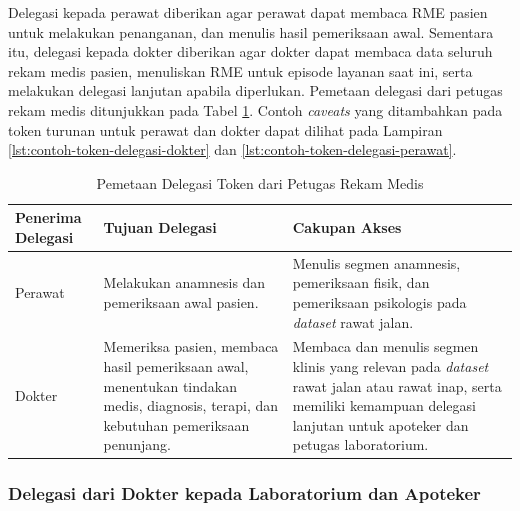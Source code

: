 \documentclass[bahasa, 12pt, a4paper, onecolumn, oneside, final]{report}
\begin{document}
Delegasi kepada perawat diberikan agar perawat dapat membaca RME pasien untuk melakukan penanganan, dan menulis hasil pemeriksaan awal. Sementara itu, delegasi kepada dokter diberikan agar dokter dapat membaca data seluruh rekam medis pasien, menuliskan RME untuk episode layanan saat ini, serta melakukan delegasi lanjutan apabila diperlukan. Pemetaan delegasi dari petugas rekam medis ditunjukkan pada Tabel \ref{tab:pemetaan-delegasi-rekam-medis}. Contoh \textit{caveats} yang ditambahkan pada token turunan untuk perawat dan dokter dapat dilihat pada Lampiran \ref{lst:contoh-token-delegasi-dokter} dan \ref{lst:contoh-token-delegasi-perawat}.

\begin{table}[!ht]
	\centering
	\caption{Pemetaan Delegasi Token dari Petugas Rekam Medis}
	\label{tab:pemetaan-delegasi-rekam-medis}
	\small
	\begin{tabular}{|p{}|p{}|p{}|}
		\hline
		\textbf{Penerima Delegasi} & \textbf{Tujuan Delegasi}                                                                                                                                                              & \textbf{Cakupan Akses} \\ \hline

		Perawat
		                           & Melakukan anamnesis dan pemeriksaan awal pasien.
		                           & Menulis segmen anamnesis, pemeriksaan fisik, dan pemeriksaan psikologis pada \textit{dataset} rawat jalan.                                                                                                     \\ \hline

		Dokter
		                           & Memeriksa pasien, membaca hasil pemeriksaan awal, menentukan tindakan medis, diagnosis, terapi, dan kebutuhan pemeriksaan penunjang.
		                           & Membaca dan menulis segmen klinis yang relevan pada \textit{dataset} rawat jalan atau rawat inap, serta memiliki kemampuan delegasi lanjutan untuk apoteker dan petugas laboratorium.                          \\ \hline
	\end{tabular}
\end{table}

\subsubsection{Delegasi dari Dokter kepada Laboratorium dan Apoteker}
\label{subsec:delegasi-dari-dokter-kepada-laboratorium-dan-apoteker}
\end{document}
